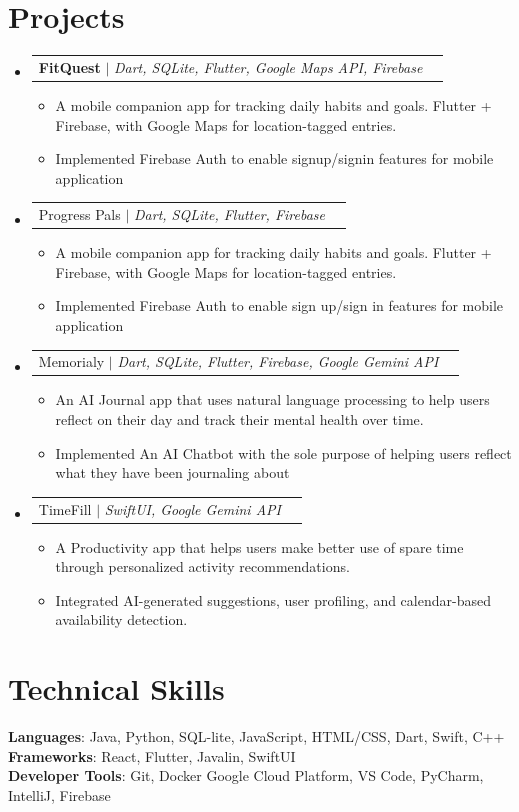 \documentclass[letterpaper,11pt]{article}
\makeatletter
\newcommand{\resumeItem}[1]{
  \item\small{
    {#1 \vspace{-2pt}}
  }
}
\newcommand{\resumeProjectHeading}[2]{
    \item
    \begin{tabular*}{0.97\textwidth}{l@{\extracolsep{\fill}}r}
      \small#1 & #2 \\
    \end{tabular*}\vspace{-7pt}
}
\newcommand{\resumeSubHeadingListStart}{\begin{itemize}[leftmargin=0.15in, label={}]}
\newcommand{\resumeSubHeadingListEnd}{\end{itemize}}
\newcommand{\resumeItemListStart}{\begin{itemize}}
\newcommand{\resumeItemListEnd}{\end{itemize}\vspace{-5pt}}
\makeatother
\begin{document}
\section{Projects}
    \resumeSubHeadingListStart
      \resumeProjectHeading
          {\textbf{FitQuest} $|$ \emph{Dart, SQLite, Flutter, Google Maps API, Firebase}}{}
          \resumeItemListStart
            \resumeItem{A mobile companion app for tracking daily habits and goals. Flutter + Firebase, with Google Maps for location-tagged entries.}
            \resumeItem{Implemented Firebase Auth to enable signup/signin features for mobile application}
          \resumeItemListEnd

    \resumeProjectHeading
          {Progress Pals $|$ \emph{Dart, SQLite, Flutter, Firebase}}{}
          \resumeItemListStart
            \resumeItem{A mobile companion app for tracking daily habits and goals. Flutter + Firebase, with Google Maps for location-tagged entries.}
            \resumeItem{Implemented Firebase Auth to enable sign up/sign in features for mobile application}
          \resumeItemListEnd

    \resumeProjectHeading
          {Memorialy $|$ \emph{Dart, SQLite, Flutter, Firebase, Google Gemini API}}{}
          \resumeItemListStart
            \resumeItem{An AI Journal app that uses natural language processing to help users reflect on their day and track their mental health over time.}
            \resumeItem{Implemented An AI Chatbot with the sole purpose of helping users reflect what they have been journaling about}
          \resumeItemListEnd

    \resumeProjectHeading
          {TimeFill $|$ \emph{SwiftUI, Google Gemini API}}{}
          \resumeItemListStart
            \resumeItem{A Productivity app that helps users make better use of spare time through personalized activity recommendations.}
            \resumeItem{Integrated AI-generated suggestions, user profiling, and calendar-based availability detection.}
          \resumeItemListEnd
    \resumeSubHeadingListEnd


%
\section{Technical Skills}
 \begin{itemize}[leftmargin=0.15in, label={}]
    \small{\item{
     \textbf{Languages}{: Java, Python, SQL-lite, JavaScript, HTML/CSS, Dart, Swift, C++} \\
     \textbf{Frameworks}{: React, Flutter, Javalin, SwiftUI} \\
     \textbf{Developer Tools}{: Git, Docker Google Cloud Platform, VS Code, PyCharm, IntelliJ, Firebase} \\
    }}
 \end{itemize}


\end{document}
